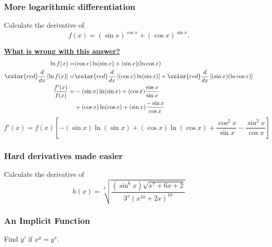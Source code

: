 \begin{frame}[t]
	\fontsize{13}{13}\selectfont
	\frametitle{More logarithmic differentiation}

	\begin{block}{}
		Calculate the derivative of
		\[
			f(x) = \left( \sin x \right)^{\cos x}+ \left( \cos x \right)^{\sin x}.
		\]
	\end{block}

	\vfill

	{\bfseries \underline{What is wrong with this answer?}}
	\begin{align*}
		\ln f(x) =                                          & (\cos x) \ln ( \sin x )+ ( \sin x ) ( \ln \cos x )                                                                                   \\
		{\color{red} \frac{d}{dx}}\left[ \ln f(x) \right] = & {\color{red} \frac{d}{dx}}\left[ (\cos x) \ln ( \sin x ) \right] +{\color{red} \frac{d}{dx}}\left[ ( \sin x ) ( \ln \cos x ) \right] \\
		\frac{f'(x)}{f(x)}=                                 & - ( \sin x ) \ln (\sin x) + (\cos x ) \frac{\cos x}{\sin x}                                                                          \\
		                                                    & + ( \cos x ) \ln (\cos x) + (\sin x ) \frac{- \sin x}{\cos x}
	\end{align*}
	\[
		{f'(x) = f(x) \left[ - (\sin x) \ln(\sin x) + (\cos x) \ln (\cos x) + \frac{\cos^{2}x}{\sin x} - \frac{\sin^{2}x}{\cos x} \right]}
	\]
\end{frame}

\begin{frame}[t]
	\frametitle{Hard derivatives made easier}

	\vspace{5mm}
	\begin{block}{}
		Calculate the derivative of
		\[
			h(x) = \sqrt[3]{\frac{\left( \sin^{6}x \right) \sqrt{x^7+6x+2}}{3^{x}\left(x^{10}+2x\right)^{10}}}
		\]
	\end{block}
\end{frame}

\begin{frame}[t]
	\frametitle{An Implicit Function}

	\vspace{5mm}
	\begin{block}{}
		Find $y'$ if $x^{y}=y^{x}$.
	\end{block}
\end{frame}


